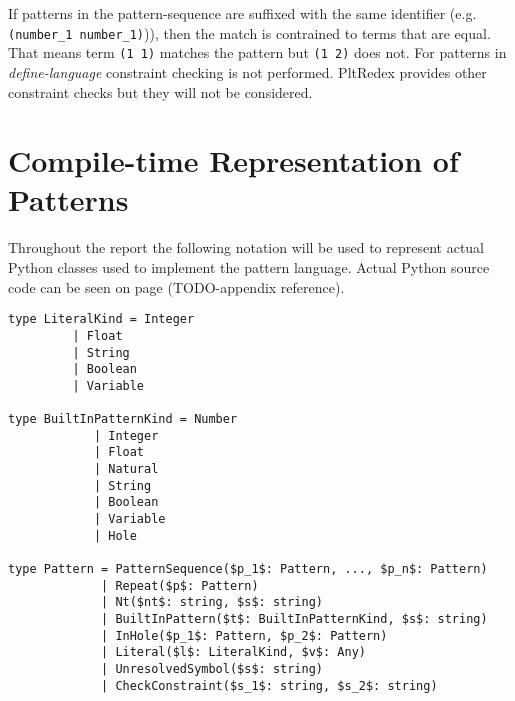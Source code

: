 If patterns in the pattern-sequence are suffixed with the same identifier (e.g. \texttt{(number\_1 number\_1)})), then the match is contrained to terms that are equal. That means term \texttt{(1 1)} matches the pattern but \texttt{(1 2)} does not. For patterns in \textit{define-language} constraint checking is not performed. PltRedex provides other constraint checks but they will not be considered.

\section{Compile-time Representation of Patterns}

Throughout the report the following notation will be used to represent actual Python classes used to implement the pattern language. Actual Python source code can be seen on page (TODO-appendix reference). 

\begin{lstlisting}
type LiteralKind = Integer 
		 | Float 
		 | String 
		 | Boolean 
		 | Variable 

type BuiltInPatternKind = Number 
			| Integer 
			| Float 
			| Natural 
			| String 
			| Boolean 
			| Variable 
			| Hole

type Pattern = PatternSequence($p_1$: Pattern, ..., $p_n$: Pattern)
             | Repeat($p$: Pattern)
             | Nt($nt$: string, $s$: string)
             | BuiltInPattern($t$: BuiltInPatternKind, $s$: string)
             | InHole($p_1$: Pattern, $p_2$: Pattern)
             | Literal($l$: LiteralKind, $v$: Any)
             | UnresolvedSymbol($s$: string)
             | CheckConstraint($s_1$: string, $s_2$: string)
\end{lstlisting}



